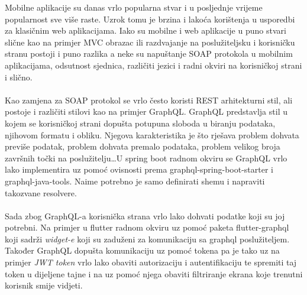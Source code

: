 \documentclass[times, utf8, zavrsni]{fer}
\begin{document}
\begin{sazetak}
      Mobilne aplikacije su danas vrlo popularna stvar i u posljednje vrijeme popularnost sve više raste.
      Uzrok tomu je brzina i lakoća korištenja u usporedbi za klasičnim web aplikacijama. Iako su mobilne
      i web aplikacije u puno stvari slične kao na primjer MVC obrazac ili razdvajanje na poslužiteljsku i
      korisničku stranu postoji i puno razlika a neke su napuštanje SOAP protokola u mobilnim
      aplikacijama, odsutnost sjednica, različiti jezici i radni okviri na korisničkoj strani i slično.
      \\\\
      Kao zamjena za SOAP protokol se vrlo često koristi REST arhitekturni stil, ali postoje i različiti
      stilovi kao na primjer GraphQL. GraphQL predstavlja stil u kojem se korisničkoj strani dopušta
      potupuna sloboda u biranju podataka, njihovom formatu i obliku. Njegova karakteristika je što
      rješava problem dohvata previše podatak, problem dohvata premalo podataka, problem velikog broja
      završnih točki na poslužitelju\dots U spring boot radnom okviru se GraphQL vrlo lako implementira uz
      pomoć ovisnosti prema graphql-spring-boot-starter i graphql-java-tools. Naime potrebno je samo definirati
      shemu i napraviti takozvane resolvere.
      \\\\
      Sada zbog GraphQL-a korisnička strana vrlo lako dohvati podatke koji su joj potrebni. Na primjer
      u flutter radnom okviru uz pomoć paketa flutter-graphql koji sadrži \textit{widget-e} koji su
      zaduženi za komunikaciju sa graphql poslužiteljem. Također GraphQL dopušta komunikaciju uz pomoć tokena
      pa je tako uz na primjer \textit{JWT token} vrlo lako obaviti autorizaciju i autentifikaciju te spremiti
      taj token u dijeljene tajne i na uz pomoć njega obaviti filtriranje ekrana koje trenutni korisnik smije
      vidjeti.
      \\\\
      \\\\\\\\
\end{sazetak}
\end{document}
